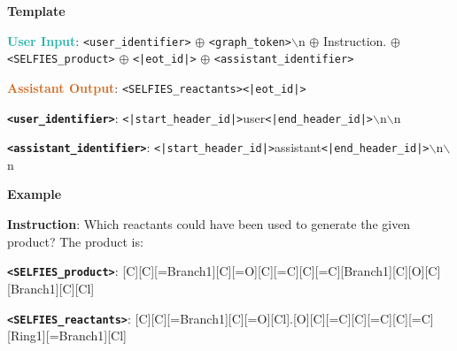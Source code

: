 \begin{tcolorbox}[colback=white!98!black,colframe=white!30!black,boxsep=1.1pt,top=6.75pt]%
\scriptsize
\noindent\makebox[\textwidth]{\rule{\textwidth}{1pt}}
\textbf{Template}
\\[-0.575em]
\noindent\makebox[\textwidth]{\rule{\textwidth}{1pt}}

\textbf{\textcolor[HTML]{20B2AA}{User Input}}: {\tt <user\_identifier>} $\oplus$ {\tt <graph\_token>}$\backslash$n $\oplus$ Instruction. $\oplus$ {\tt <SELFIES\_product>} $\oplus$ {\tt <|eo\-t\_id|>} $\oplus$ {\tt <assistant\_identifier>}

\textbf{\textcolor[HTML]{D2691E}{Assistant Output}}: {\tt <SELFIES\_reactants>}{\tt <|eot\_id|>}

{\tt \textbf{<user\_identifier>}}: {\tt <|start\_header\_id|>}user{\tt <|end\_header\_id|>}$\backslash$n$\backslash$n

{\tt \textbf{<assistant\_identifier>}}: {\tt <|start\_header\_id|>}assistant{\tt <|end\_header\_id|>}$\backslash$n$\backslash$n

\noindent\makebox[\textwidth]{\rule{\textwidth}{1pt}}
\textbf{Example}
\\[-0.575em]
\noindent\makebox[\textwidth]{\rule{\textwidth}{1pt}}

\begin{tcolorbox}[colback=cyan!7!white,colframe=white!98!black,boxsep=1.1pt,top=6.75pt]
\textbf{Instruction}: Which reactants could have been used to generate the given product? The product is:

{\tt \textbf{<SELFIES\_product>}}: [C][C][=Branch1][C][=O][C][=C][C][=C][Branch1][C][O][C][Branch1][C][Cl]\-[=C][Ring1][Branch2]

\end{tcolorbox}

\begin{tcolorbox}[colback=orange!7!white,colframe=white!98!black,boxsep=1.1pt,top=6.75pt]
{\tt \textbf{<SELFIES\_reactants>}}: [C][C][=Branch1][C][=O][Cl].[O][C][=C][C][=C][C][=C][Ring1][=Branch1][Cl]
\end{tcolorbox}
\end{tcolorbox}

